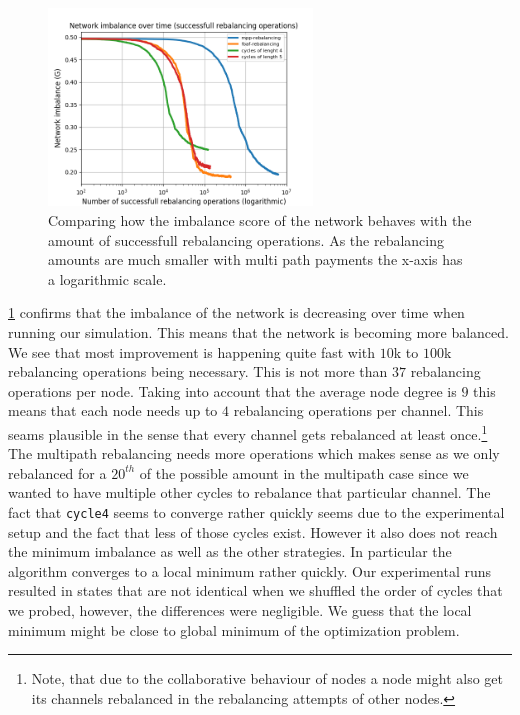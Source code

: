 \documentclass[a4paper]{paper}
\begin{document}
\begin{figure}
 \centering
 \includegraphics[width=7cm]{code/vs/fig/imba_vs_steps.png}
 \caption{Comparing how the imbalance score of the network behaves with the amount of successfull rebalancing operations. As the rebalancing amounts are much smaller with multi path payments the x-axis has a logarithmic scale.}
 \label{fig:imbalancehovertime}
\end{figure}

\cref{fig:imbalancehovertime} confirms that the imbalance of the network is decreasing over time when running our simulation.
This means that the network is becoming more balanced.
We see that most improvement is happening quite fast with $10$k to $100$k rebalancing operations being necessary.
This is not more than $37$ rebalancing operations per node.
Taking into account that the average node degree is $9$ this means that each node needs up to $4$ rebalancing operations per channel.  
This seams plausible in the sense that every channel gets rebalanced at least once.\footnote{Note, that due to the collaborative behaviour of nodes a node might also get its channels rebalanced in the rebalancing attempts of other nodes.}
The multipath rebalancing needs more operations which makes sense as we only rebalanced for a $20^{th}$ of the possible amount in the multipath case since we wanted to have multiple other cycles to rebalance that particular channel.
The fact that \texttt{cycle4} seems to converge rather quickly seems due to the experimental setup and the fact that less of those cycles exist. However it also does not reach the minimum imbalance as well as the other strategies. 
In particular the algorithm converges to a local minimum rather quickly.
Our experimental runs resulted in states that are not identical when we shuffled the order of cycles that we probed, however, the differences were negligible. 
We guess that the local minimum might be close to global minimum of the optimization problem.
\end{document}
